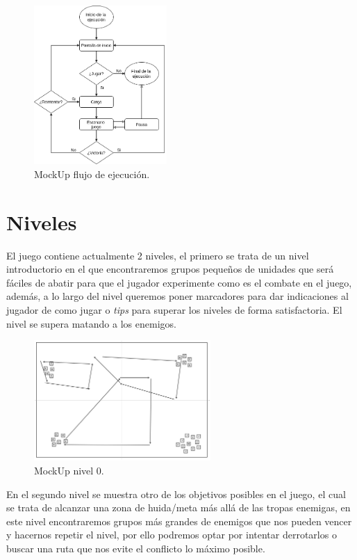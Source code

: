 \begin{figure}[ht]
\centering
\includegraphics[width=0.45\textwidth]{imagenes/gdd/pantallas/flow_ejecucion.png}
\caption{MockUp flujo de ejecución.}
\label{esq:flow_juego}
\end{figure}

\section{Niveles}
El juego contiene actualmente 2 niveles, el primero se trata de un nivel introductorio
en el que encontraremos grupos pequeños de unidades que será fáciles de abatir para que el jugador experimente
como es el combate en el juego, además, a lo largo del nivel queremos poner marcadores para dar indicaciones
al jugador de como jugar o \textit{tips} para superar los niveles de forma satisfactoria.
El nivel se supera matando a los enemigos.

\begin{figure}[ht]
\centering
\includegraphics[width=0.6\textwidth]{imagenes/gdd/nivel0.png}
\caption{MockUp nivel 0.}
\label{esq:lvl0}
\end{figure}

En el segundo nivel se muestra otro de los objetivos posibles en el juego, el cual se trata de alcanzar
una zona de huida/meta más allá de las tropas enemigas, en este nivel encontraremos
grupos más grandes de enemigos que nos pueden vencer y hacernos repetir el nivel, por ello podremos optar
por intentar derrotarlos o buscar una ruta que nos evite el conflicto lo máximo posible. 

